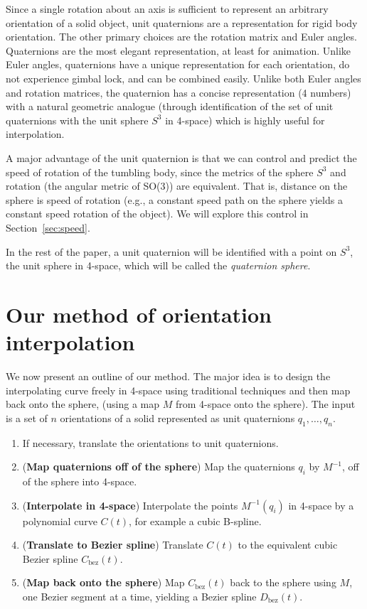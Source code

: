Since a single rotation about an axis is sufficient
to represent an arbitrary orientation of a solid object,
unit quaternions are a representation for rigid body orientation.
The other primary choices are the rotation matrix and Euler angles.
Quaternions are the most elegant representation, at least for animation.
Unlike Euler angles, quaternions have a unique representation 
for each orientation, do not experience gimbal lock, and can be
combined easily.
Unlike both Euler angles and rotation matrices,
the quaternion has a concise representation (4 numbers) with a natural
geometric analogue (through identification of the set of unit quaternions 
with the unit sphere $S^3$ in 4-space) which is highly useful for interpolation.

A major advantage of the unit quaternion is that we can 
control and predict the speed of rotation of the tumbling body,
since the metrics of the sphere $S^3$ and rotation (the angular metric of
SO(3)) are equivalent.
That is, distance on the sphere is speed of rotation (e.g.,
a constant speed path on the sphere yields a constant speed rotation
of the object).
We will explore this control in Section~\ref{sec:speed}.


In the rest of the paper, a unit quaternion will be identified
with a point on $S^3$, the unit sphere in 4-space, which will be
called the {\em quaternion sphere}.

\section{Our method of orientation interpolation}
\label{sec:method}

We now present an outline of our method.
The major idea is to design the interpolating curve freely in 4-space
using traditional techniques and then map back onto the sphere,
(using a map $M$ from 4-space onto the sphere).
The input is a set of $n$ orientations of a solid
represented as unit quaternions $q_1,\ldots,q_n$.

\begin{enumerate}
\item
	If necessary, translate the orientations to unit quaternions.
\item
	({\bf Map quaternions off of the sphere})
	Map the quaternions $q_i$ by $M^{-1}$,
	off of the sphere into 4-space.
\item
	({\bf Interpolate in 4-space})
	Interpolate the points $M^{-1}(q_i)$ in 4-space
	by a polynomial curve $C(t)$, for example a cubic B-spline.
\item
	({\bf Translate to Bezier spline})
	Translate $C(t)$ to the equivalent cubic Bezier spline 
	$C_{\mbox{bez}}(t)$.
\item
	({\bf Map back onto the sphere})
	Map $C_{\mbox{bez}}(t)$ back to the sphere using $M$, 
	one Bezier segment at a time, yielding a  
	Bezier spline $D_{\mbox{bez}}(t)$. 
\end{enumerate}


